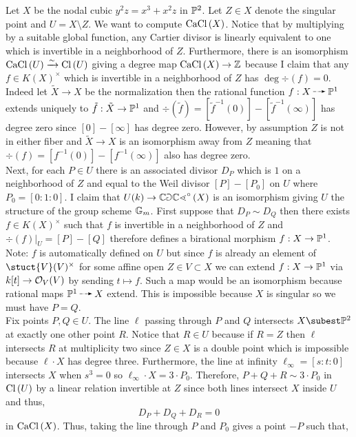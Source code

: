 \documentclass[12pt]{article}
\begin{document}
Let $X$ be the nodal cubic $y^2 z = x^3 + x^2 z$ in $\P^2$. Let $Z \in X$ denote the singular point and $U = X \setminus Z$. We want to compute $\CaCl{X}$. Notice that by multiplying by a suitable global function, any Cartier divisor is linearly equivalent to one which is invertible in a neighborhood of $Z$. Furthermore, there is an isomorphism $\CaCl{U} \iso \Cl{U}$ giving a degree map $\CaCl{X} \to \Z$ because I claim that any $f \in K(X)^\times$ which is invertible in a neighborhood of $Z$ has $\deg{\div{(f)}} = 0$. Indeed let $\tilde{X} \to X$ be the normalization then the rational function $f : X \rat \P^1$ extends uniquely to $\tilde{f} : \tilde{X} \to \P^1$ and $\div{(\tilde{f})} = [\tilde{f}^{-1}(0)] - [\tilde{f}^{-1}(\infty)]$ has degree zero since $[0] - [\infty]$ has degree zero. However, by assumption $Z$ is not in either fiber and $\tilde{X} \to X$ is an isomorphism away from $Z$ meaning that $\div{(f)} = [f^{-1}(0)] - [f^{-1}(\infty)]$ also has degree zero. 
\bigskip\\
Next, for each $P \in U$ there is an associated divisor $D_P$ which is $1$ on a neighborhood of $Z$ and equal to the Weil divisor $[P] - [P_0]$ on $U$ where $P_0 = [0:1:0]$. I claim that $U(k) \to \CaClcirc{X}$ is an isomorphism giving $U$ the structure of the group scheme $\Gm$. First suppose that $D_P \sim D_Q$ then there exists $f \in K(X)^\times$ such that $f$ is invertible in a neighborhood of $Z$ and $\div{(f)}|_U = [P] - [Q]$ therefore defines a birational morphism $f : X \to \P^1$. Note: $f$ is automatically defined on $U$ but since $f$ is already an element of $\stuct{V}(V)^\times$ for some affine open $Z \in V \subset X$ we can extend $f : X \to \P^1$ via $k[t] \to \struct{V}(V)$ by sending $t \mapsto f$. Such a map would be an isomorphism because rational maps $\P^1 \rat X$ extend. This is impossible because $X$ is singular so we must have $P = Q$.
\bigskip\\
Fix points $P,Q \in U$. The line $\ell$ passing through $P$ and $Q$ intersects $X \subest \P^2$ at exactly one other point $R$. Notice that $R \in U$ because if $R = Z$ then $\ell$ intersects $R$ at multiplicity two since $Z \in X$ is a double point which is impossible because $\ell \cdot X$ has degree three. Furthermore, the line at infinity $\ell_\infty = [s : t : 0]$ intersects $X$ when $s^3 = 0$ so $\ell_\infty \cdot X = 3 \cdot P_0$. Therefore, $P + Q + R \sim 3 \cdot P_0$ in $\Cl{U}$ by a linear relation invertible at $Z$ since both lines intersect $X$ inside $U$ and thus,
\[ D_P + D_Q + D_R = 0 \]
in $\CaCl{X}$. Thus, taking the line through $P$ and $P_0$ gives a point $-P$ such that,
\end{document}
